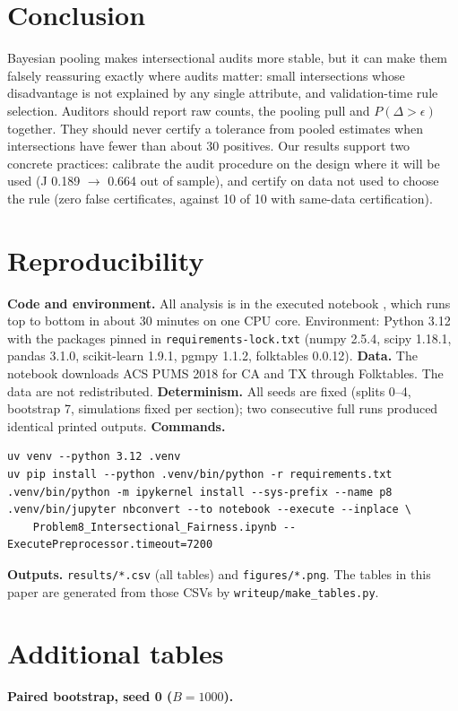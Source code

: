 \documentclass[11pt]{article}
\begin{document}
\section{Conclusion}
Bayesian pooling makes intersectional audits more stable, but it can make them falsely reassuring exactly where audits
matter: small intersections whose disadvantage is not explained by any single attribute, and validation-time rule
selection. Auditors should report raw counts, the pooling pull and $P(\Delta>\epsilon)$ together. They should never
certify a tolerance from pooled estimates when intersections have fewer than about 30 positives. Our results support two
concrete practices: calibrate the audit procedure on the design where it will be used (J 0.189 $\to$ 0.664 out of sample),
and certify on data not used to choose the rule (zero false certificates, against 10 of 10 with same-data certification).

\clearpage


\appendix
\section{Reproducibility}
\textbf{Code and environment.} All analysis is in the executed notebook \nb{}, which runs top to bottom in about
30 minutes on one CPU core. Environment: Python 3.12 with the packages pinned in \texttt{requirements-lock.txt}
(numpy 2.5.4, scipy 1.18.1, pandas 3.1.0, scikit-learn 1.9.1, pgmpy 1.1.2, folktables 0.0.12).
\textbf{Data.} The notebook downloads ACS PUMS 2018 for CA and TX through Folktables. The data are not redistributed.
\textbf{Determinism.} All seeds are fixed (splits 0--4, bootstrap 7, simulations fixed per section); two consecutive
full runs produced identical printed outputs.
\textbf{Commands.}
\begin{verbatim}
uv venv --python 3.12 .venv
uv pip install --python .venv/bin/python -r requirements.txt
.venv/bin/python -m ipykernel install --sys-prefix --name p8
.venv/bin/jupyter nbconvert --to notebook --execute --inplace \
    Problem8_Intersectional_Fairness.ipynb --ExecutePreprocessor.timeout=7200
\end{verbatim}
\textbf{Outputs.} \texttt{results/*.csv} (all tables) and \texttt{figures/*.png}. The tables in this paper are generated
from those CSVs by \texttt{writeup/make\_tables.py}.

\section{Additional tables}
\begin{landscape}
{\footnotesize\setlength{\tabcolsep}{3pt}}
\medskip
\noindent\textbf{Paired bootstrap, seed 0 ($B=1000$).}\par
{\footnotesize}
\end{landscape}
\end{document}

